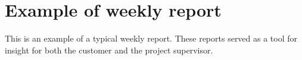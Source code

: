 \section{Example of weekly report}
\label{weekly_rep}

This is an example of a typical weekly report. These reports served as a tool for insight for both the customer and the project supervisor.

